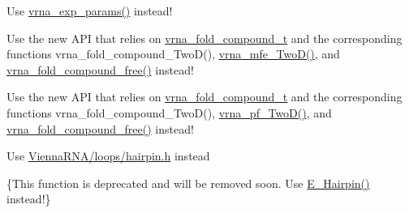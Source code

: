 \begin{DoxyRefList}
%
Use \mbox{\hyperlink{group__energy__parameters_gab1f3016f96aa96bff020cdd904605afa}{vrna\+\_\+exp\+\_\+params()}} instead! 
\item[Global \mbox{\hyperlink{group__kl__neighborhood__mfe_gac9284f132cf0eaa0a2f43590eda05488}{get\+\_\+\+Two\+Dfold\+\_\+variables}} (const char $\ast$seq, const char $\ast$structure1, const char $\ast$structure2, int circ)]\label{deprecated__deprecated000002}%
%
Use the new A\+PI that relies on \mbox{\hyperlink{group__fold__compound_ga1b0cef17fd40466cef5968eaeeff6166}{vrna\+\_\+fold\+\_\+compound\+\_\+t}} and the corresponding functions vrna\+\_\+fold\+\_\+compound\+\_\+\+Two\+D(), \mbox{\hyperlink{group__kl__neighborhood__mfe_ga243c288b463147352829df04de6a2f77}{vrna\+\_\+mfe\+\_\+\+Two\+D()}}, and \mbox{\hyperlink{group__fold__compound_ga576a077b418a9c3650e06f8e5d296fc2}{vrna\+\_\+fold\+\_\+compound\+\_\+free()}} instead! 
\item[Global \mbox{\hyperlink{2Dpfold_8h_a1aca740e2a75ab2b2951538266e53d64}{get\+\_\+\+Two\+Dpfold\+\_\+variables}} (const char $\ast$seq, const char $\ast$structure1, char $\ast$structure2, int circ)]\label{deprecated__deprecated000007}%
%
Use the new A\+PI that relies on \mbox{\hyperlink{group__fold__compound_ga1b0cef17fd40466cef5968eaeeff6166}{vrna\+\_\+fold\+\_\+compound\+\_\+t}} and the corresponding functions vrna\+\_\+fold\+\_\+compound\+\_\+\+Two\+D(), \mbox{\hyperlink{group__kl__neighborhood__pf_ga0bc3427689bd09da09b8b3094a27f836}{vrna\+\_\+pf\+\_\+\+Two\+D()}}, and \mbox{\hyperlink{group__fold__compound_ga576a077b418a9c3650e06f8e5d296fc2}{vrna\+\_\+fold\+\_\+compound\+\_\+free()}} instead! 
\item[File \mbox{\hyperlink{hairpin__loops_8h}{hairpin\+\_\+loops.h}} ]\label{deprecated__deprecated000084}%
%
Use \mbox{\hyperlink{hairpin_8h}{Vienna\+R\+N\+A/loops/hairpin.\+h}} instead  
\item[Global \mbox{\hyperlink{group__mfe__global__deprecated_gab327ce11972f5ac069d52c8dedfdb700}{HairpinE}} (int size, int type, int si1, int sj1, const char $\ast$string)]\label{deprecated__deprecated000077}%
%
\{This function is deprecated and will be removed soon. Use \mbox{\hyperlink{group__eval__loops__hp_gadf943ee9a45b7f4cee9192c06210dace}{E\+\_\+\+Hairpin()}} instead!\}  
\item[Global \mbox{\hyperlink{strings_8h_ad9dc7bfc9aa664dc6698f17ce07fc7e7}{hamming}} (const char $\ast$s1, const char $\ast$s2)]\label{deprecated__deprecated000195}%

\end{DoxyRefList}
